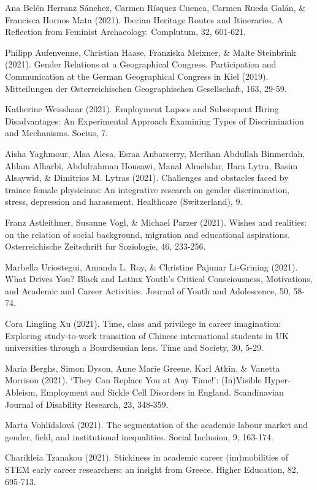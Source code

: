 \documentclass[runningheads]{llncs}
\begin{document}
\begin{multicols}{2}
Ana Belén Herranz Sánchez, Carmen Rísquez Cuenca, Carmen Rueda Galán, \& Francisca Hornos Mata (2021). Iberian Heritage Routes and Itineraries. A Reflection from Feminist Archaeology. Complutum, 32, 601-621.

Philipp Aufenvenne, Christian Haase, Franziska Meixner, \& Malte Steinbrink (2021). Gender Relations at a Geographical Congress. Participation and Communication at the German Geographical Congress in Kiel (2019). Mitteilungen der Osterreichischen Geographischen Gesellschaft, 163, 29-59.

Katherine Weisshaar (2021). Employment Lapses and Subsequent Hiring Disadvantages: An Experimental Approach Examining Types of Discrimination and Mechanisms. Socius, 7.

Aisha Yaghmour, Alaa Alesa, Esraa Anbarserry, Merihan Abdullah Binmerdah, Ahlam Alharbi, Abdulrahman Housawi, Manal Almehdar, Hara Lytra, Basim Alsaywid, \& Dimitrios M. Lytras (2021). Challenges and obstacles faced by trainee female physicians: An integrative research on gender discrimination, stress, depression and harassment. Healthcare (Switzerland), 9.

Franz Astleithner, Susanne Vogl, \& Michael Parzer (2021). Wishes and realities: on the relation of social background, migration and educational aspirations. Osterreichische Zeitschrift fur Soziologie, 46, 233-256.

Marbella Uriostegui, Amanda L. Roy, \& Christine Pajunar Li-Grining (2021). What Drives You? Black and Latinx Youth’s Critical Consciousness, Motivations, and Academic and Career Activities. Journal of Youth and Adolescence, 50, 58-74.

Cora Lingling Xu (2021). Time, class and privilege in career imagination: Exploring study-to-work transition of Chinese international students in UK universities through a Bourdieusian lens. Time and Society, 30, 5-29.

Maria Berghs, Simon Dyson, Anne Marie Greene, Karl Atkin, \& Vanetta Morrison (2021). ‘They Can Replace You at Any Time!’: (In)Visible Hyper-Ableism, Employment and Sickle Cell Disorders in England. Scandinavian Journal of Disability Research, 23, 348-359.

Marta Vohlídalová (2021). The segmentation of the academic labour market and gender, field, and institutional inequalities. Social Inclusion, 9, 163-174.

Charikleia Tzanakou (2021). Stickiness in academic career (im)mobilities of STEM early career researchers: an insight from Greece. Higher Education, 82, 695-713.


\end{multicols}
\end{document}
